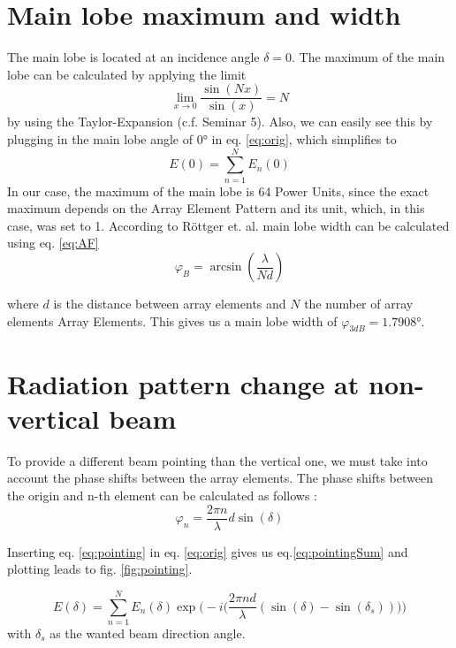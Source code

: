 \section{Main lobe maximum and width}
The main lobe is located at an incidence angle $\delta = 0$. 
The maximum of the main lobe can be calculated by applying the limit $$\lim_{x\to0} \frac{\sin(Nx)}{\sin(x)} = N $$ by using the Taylor-Expansion (c.f. Seminar 5).
Also, we can easily see this by plugging in the main lobe angle of 0° in eq. \ref{eq:orig}, which simplifies to
\begin{equation}
	E(0) = \sum_{n=1}^N E_n(0)
\end{equation}
In our case, the maximum of the main lobe is 64 Power Units, since the exact maximum depends on the Array Element Pattern and its unit, which, in this case, was set to 1.
According to Röttger et. al. \citep{roettger1989instrumental} main lobe width can be calculated using eq. \ref{eq:AF}
\begin{equation}
	\varphi_{B} = \arcsin(\frac{\lambda}{Nd})
\end{equation}

where $d$ is the distance between array elements and $N$ the number of array elements Array Elements. This gives us a main lobe width of $\varphi_{3dB} = 1.7908$°.


\section{Radiation pattern change at non-vertical beam}
To provide a different beam pointing than the vertical one, we must take into account the phase shifts between the array elements. The phase shifts between the origin and n-th element can be calculated as follows \citep{richards2010principles}:
\begin{equation}
	\varphi_n = \frac{2\pi n}{\lambda}d \sin(\delta)
	\label{eq:pointing}
\end{equation}

Inserting eq. \ref{eq:pointing} in eq. \ref{eq:orig} gives us eq.\ref{eq:pointingSum} and plotting leads to fig. \ref{fig:pointing}.

\begin{equation}
	E(\delta) = \sum_{n=1}^N E_n(\delta) \exp \Bigg(-i\Big(\frac{2 \pi nd}{\lambda} (\sin(\delta) - \sin(\delta_s)) \Big)\Bigg)
	\label{eq:pointingSum}
\end{equation}
with $\delta_s$ as the wanted beam direction angle.

